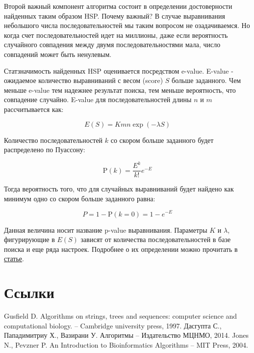 \documentclass[letterpaper, 11pt]{article}
\newcommand{\prob}{\mathrm{P}}
\begin{document}
Второй важный компонент алгоритма состоит в определении достоверности найденных таким образом HSP. Почему важный? В случае выравнивания небольшого числа последовательностей мы таким вопросом не озадачиваемся. Но когда счет последовательностей идет на миллионы, даже если вероятность случайного совпадения  между двумя последовательностями мала, число совпадений может быть ненулевым.

Статзначимость найденных HSP оценивается посредством e-value. E-value - ожидаемое количество выравниваний с весом (score) $S$ больше заданного. Чем меньше e-value тем надежнее результат поиска, тем меньше вероятность, что совпадение случайно. E-value для последовательностей длины $n$ и $m$ рассчитывается как:

$$E(S)=Kmn \exp(-\lambda S)$$

Количество последовательностей $k$ со скором больше заданного будет распределено по Пуассону:

$$\prob(k)=\frac{E^k}{k!}e^{-E}$$

Тогда вероятность того, что для случайных выравниваний будет найдено как минимум одно со скором больше заданного равна:

$$P=1-\prob(k=0)=1-e^{-E}$$

Данная величина носит название p-value выравнивания. Параметры $K$ и $\lambda$, фигурирующие в $E(S)$ зависят от количества последовательностей в базе поиска и еще ряда настроек. Подробнее о их определении можно прочитать в \href{http://www.ncbi.nlm.nih.gov/pmc/articles/PMC53667/pdf/pnas01031-0226.pdf}{статье}.




\section{Ссылки}
\begingroup
\renewcommand{\section}[2]{}%
\begin{thebibliography}{7}
Gusfield D. Algorithms on strings, trees and sequences: computer science and computational biology. – Cambridge university press, 1997.
Дасгупта С., Пападимитриу Х., Вазирани У. Алгоритмы – Издательство МЦНМО, 2014.
Jones N., Pevzner P. An Introduction to Bioinformatics Algorithms – MIT Press, 2004.
\end{thebibliography}
\end{document}
